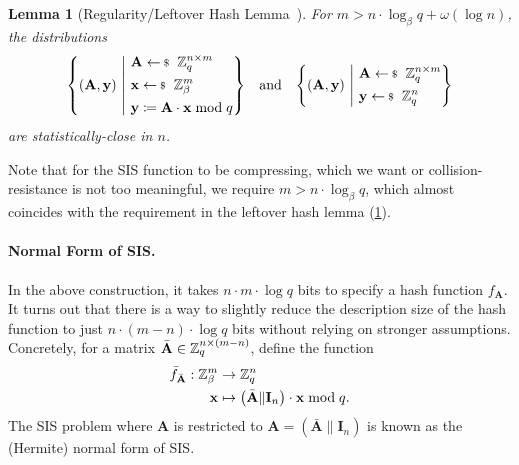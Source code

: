 \documentclass[10pt,twoside]{article}
\newtheorem{lemma}[theorem]{Lemma}
\renewcommand{\vec}[1]{\mathbf{#1}}
\newcommand{\mat}[1]{\mathbf{#1}}
\begin{document}
\begin{lemma}[Regularity/Leftover Hash Lemma~\cite{STOC:ImpLevLub89,STOC:GenPeiVai08}]\label{lem:lhl}
    For $m > n \cdot \log_\beta q + \omega(\log n)$, the distributions
    \begin{align*}
        \set{(\mat{A}, \vec{y}) ~\middle|~
        \begin{aligned}
            &\mat{A} \sample \ZZ_q^{n \times m} \\
            &\vec{x} \sample \ZZ_\beta^m \\
            &\vec{y} \coloneqq \mat{A} \cdot \vec{x} \bmod q
        \end{aligned}}
        && \text{and} &&
        \set{(\mat{A}, \vec{y}) ~\middle|~
        \begin{aligned}
            &\mat{A} \sample \ZZ_q^{n \times m} \\
            &\vec{y} \sample \ZZ_q^n
        \end{aligned}}
    \end{align*}
    are statistically-close in $n$.
\end{lemma}

Note that for the SIS function to be compressing, which we want or collision-resistance is not too meaningful, we require $m > n \cdot \log_\beta q$, which almost coincides with the requirement in the leftover hash lemma (\cref{lem:lhl}).

\paragraph*{Normal Form of SIS.}

In the above construction, it takes $n \cdot m \cdot \log q$ bits to specify a hash function $f_{\mat{A}}$.
It turns out that there is a way to slightly reduce the description size of the hash function to just $n \cdot (m - n) \cdot \log q$ bits without relying on stronger assumptions.
Concretely, for a matrix $\bar{\mat{A}} \in \ZZ_q^{n \times (m-n)}$, define the function
\begin{align*}
    \bar{f}_{\bar{\mat{A}}}: \ZZ_\beta^m &\to \ZZ_q^n \\
    \vec{x} &\mapsto \left( \bar{\mat{A}} \| \mat{I}_n \right) \cdot \vec{x} \bmod q.
\end{align*}
The SIS problem where $\mat{A}$ is restricted to $\mat{A} = \left( \bar{\mat{A}} \| \mat{I}_n \right)$ is known as the (Hermite) normal form of SIS.
\end{document}
